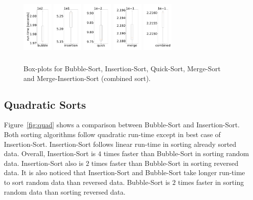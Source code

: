 \documentclass[sigconf, nonacm, natbib, screen, balance=False]{acmart}
\begin{document}
\begin{figure}
  \centering
  \includegraphics[width=15mm, height=30mm]{../figures/all_random_bubble_box.pdf}
  \includegraphics[width=15mm, height=30mm]{../figures/all_random_insertion_box.pdf}
  \includegraphics[width=15mm, height=30mm]{../figures/all_random_quick_box.pdf}
  \includegraphics[width=15mm, height=30mm]{../figures/all_random_merge_box.pdf}
    \includegraphics[width=15mm, height=30mm]{../figures/all_random_combined_box.pdf}

  \caption{Box-plots for Bubble-Sort, Insertion-Sort,  Quick-Sort, Merge-Sort and Merge-Insertion-Sort (combined sort).}
  \label{fig:fig_box}
\end{figure}

\subsection{Quadratic Sorts}
Figure~\ref{fig:quad} shows a comparison between Bubble-Sort and Insertion-Sort. Both sorting algorithms follow quadratic run-time except in best case of Insertion-Sort. Insertion-Sort follows linear run-time in sorting already sorted data. Overall, Insertion-Sort is $4$ times faster than Bubble-Sort in sorting random data. Insertion-Sort also is $2$ times faster than Bubble-Sort in sorting reversed data. It is also noticed that Insertion-Sort and Bubble-Sort take longer run-time to sort random data than reversed data. Bubble-Sort is $2$ times faster in sorting random data than sorting reversed data. 
\end{document}
